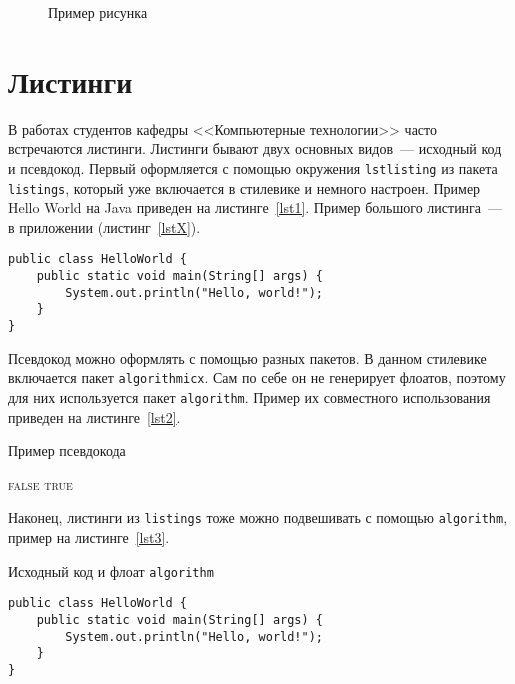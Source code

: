 \documentclass[times,specification,annotation]{itmo-student-thesis}
\begin{document}
\begin{figure}[!h]
\caption{Пример рисунка}\label{fig1}
\centering
{}
\end{figure}

\section{Листинги}

В работах студентов кафедры <<Компьютерные технологии>> часто встречаются листинги. Листинги бывают
двух основных видов~--- исходный код и псевдокод. Первый оформляется с помощью окружения \texttt{lstlisting}
из пакета \texttt{listings}, который уже включается в стилевике и немного настроен. Пример Hello World на Java
приведен на листинге~\ref{lst1}. Пример большого листинга~--- в приложении (листинг~\ref{lstX}).

\begin{lstlisting}[float=!h,caption={Пример исходного кода на Java},label={lst1}]
public class HelloWorld {
    public static void main(String[] args) {
        System.out.println("Hello, world!");
    }
}
\end{lstlisting}

Псевдокод можно оформлять с помощью разных пакетов. В данном стилевике включается пакет \texttt{algorithmicx}.
Сам по себе он не генерирует флоатов, поэтому для них используется пакет \texttt{algorithm}.
Пример их совместного использования приведен на листинге~\ref{lst2}.

\begin{algorithm}[!h]
\caption{Пример псевдокода}\label{lst2}
\begin{algorithmic}
				\State\Return \textsc{false}
			\EndIf
		\EndFor
		\State\Return \textsc{true}
	\EndFunction
\end{algorithmic}
\end{algorithm}

Наконец, листинги из \texttt{listings} тоже можно подвешивать с помощью \texttt{algorithm},
пример на листинге~\ref{lst3}.

\begin{algorithm}[!h]
\caption{Исходный код и флоат \texttt{algorithm}}\label{lst3}
\begin{lstlisting}
public class HelloWorld {
    public static void main(String[] args) {
        System.out.println("Hello, world!");
    }
}
\end{lstlisting}
\end{algorithm}
\end{document}
